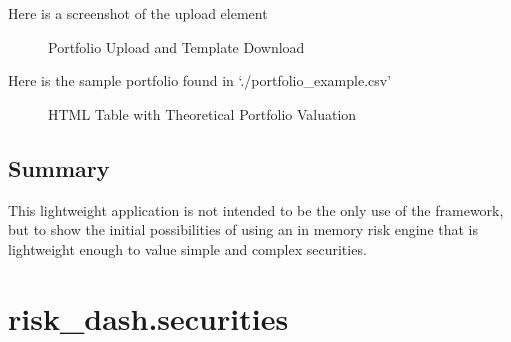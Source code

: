 \documentclass[letterpaper,10pt,english]{sphinxmanual}
\begin{document}
\sphinxAtStartPar
Here is a screenshot of the upload element

\begin{figure}[htbp]
\centering
\capstart

\noindent{}
\caption{Portfolio Upload and Template Download}\label{\detokenize{dashapp_documentation:id3}}\end{figure}

\sphinxAtStartPar
Here is the sample portfolio found in ‘./portfolio\_example.csv’

\begin{figure}[htbp]
\centering
\capstart

\noindent{}
\caption{HTML Table with Theoretical Portfolio Valuation}\label{\detokenize{dashapp_documentation:id4}}\end{figure}


\section{Summary}
\label{\detokenize{dashapp_documentation:summary}}
\sphinxAtStartPar
This lightweight application is not intended to be the only use of the
 framework, but to show the initial possibilities of using
an in memory risk engine that is lightweight enough to value simple and
complex securities.


\chapter{risk\_dash.securities}
\label{\detokenize{securities:module-risk_dash.securities}}\label{\detokenize{securities:risk-dash-securities}}\label{\detokenize{securities:securities}}\label{\detokenize{securities::doc}}
\end{document}
